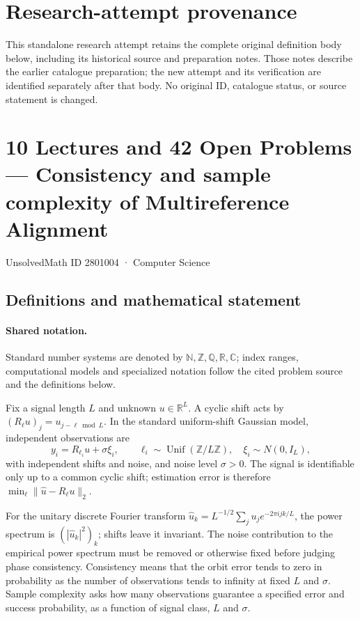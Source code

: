 \documentclass[11pt]{article}
\begin{document}
\section*{Research-attempt provenance}
This standalone research attempt retains the complete original definition body below,
including its historical source and preparation notes. Those notes describe the
earlier catalogue preparation; the new attempt and its verification are identified
separately after that body. No original ID, catalogue status, or source statement is changed.

\section{10 Lectures and 42 Open Problems — Consistency and sample complexity of Multireference Alignment}\label{2801004}
{\small UnsolvedMath ID 2801004 · Computer Science}
\subsection{Definitions and mathematical statement}

\paragraph{Shared notation.}Standard number systems are denoted by $\mathbb N,\mathbb Z,\mathbb Q,\mathbb R,\mathbb C$; index ranges, computational models and specialized notation follow the cited problem source and the definitions below.


Fix a signal length $L$ and unknown $u\in\mathbb{R}^L$. A cyclic shift acts by $(R_\ell u)_j=u_{j-\ell\bmod L}$. In the standard uniform-shift Gaussian model, independent observations are
\[
 y_i=R_{\ell_i}u+\sigma\xi_i,\qquad
 \ell_i\sim\operatorname{Unif}(\mathbb{Z}/L\mathbb{Z}),\quad
 \xi_i\sim N(0,I_L),
\]
with independent shifts and noise, and noise level $\sigma>0$. The signal is identifiable only up to a common cyclic shift; estimation error is therefore $\min_\ell\|\widehat u-R_\ell u\|_2$.

For the unitary discrete Fourier transform $\widehat u_k=L^{-1/2}\sum_j u_j e^{-2\pi i jk/L}$, the power spectrum is $(|\widehat u_k|^2)_k$; shifts leave it invariant. The noise contribution to the empirical power spectrum must be removed or otherwise fixed before judging phase consistency. Consistency means that the orbit error tends to zero in probability as the number of observations tends to infinity at fixed $L$ and $\sigma$. Sample complexity asks how many observations guarantee a specified error and success probability, as a function of signal class, $L$ and $\sigma$.
\end{document}
